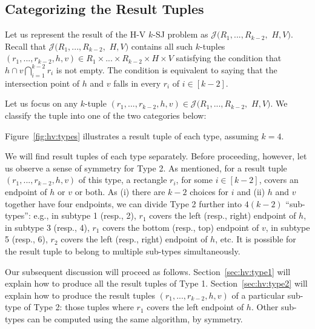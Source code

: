 \documentclass[sigconf]{acmart}
\def\vgap{\vspace{1mm}}
\def\J{\mathcal{J}}
\begin{document}
\subsection{Categorizing the Result Tuples} \label{sec:hv:result-part}

Let us represent the result of the H-V $k$-SJ problem as $\J(R_1, ..., R_{k-2},$ $H, V)$. Recall that $\J(R_1, ..., R_{k-2},$ $H, V)$ contains all such $k$-tuples $(r_1, ..., r_{k-2}, h, v) \in R_1 \times ... \times R_{k-2} \times H \times V$ satisfying the condition that $h \cap v \bigcap_{i=1}^{k-2} r_i$ is not empty. The condition is equivalent to saying that the intersection point of $h$ and $v$ falls in every $r_i$ of $i \in [k-2]$.

\vgap

Let us focus on any $k$-tuple $(r_1, ..., r_{k-2}, h, v) \in  \J(R_1, ..., R_{k-2},$ $H, V)$. We classify the tuple into one of the two categories below:

Figure~\ref{fig:hv:types} illustrates a result tuple of each type, assuming $k = 4$.


\vgap 

We will find result tuples of each type separately. Before proceeding, however, let us observe a sense of symmetry for Type 2. As mentioned, for a result tuple $(r_1, ..., r_{k-2}, h, v)$ of this type, a rectangle $r_i$, for some $i \in [k-2]$, covers an endpoint of $h$ or $v$ or both. As (i) there are $k-2$ choices for $i$ and (ii) $h$ and $v$ together have four endpoints, we can divide Type 2 further into $4(k-2)$ ``sub-types'': e.g., in subtype 1 (resp., 2), $r_1$ covers the left (resp., right) endpoint of $h$, in subtype 3 (resp., 4), $r_1$ covers the bottom (resp., top) endpoint of $v$, in subtype 5 (resp., 6), $r_2$ covers the left (resp., right) endpoint of $h$, etc. It is possible for the result tuple to belong to multiple sub-types simultaneously.

\vgap 

Our subsequent discussion will proceed as follows.  Section~\ref{sec:hv:type1} will explain how to produce all the result tuples of Type 1. Section~\ref{sec:hv:type2} will explain how to produce the result tuples $(r_1, ..., r_{k-2}, h, v)$ of a particular sub-type of Type 2: those tuples where $r_1$ covers the left endpoint of $h$. Other sub-types can be computed using the same algorithm, by symmetry.
\end{document}

